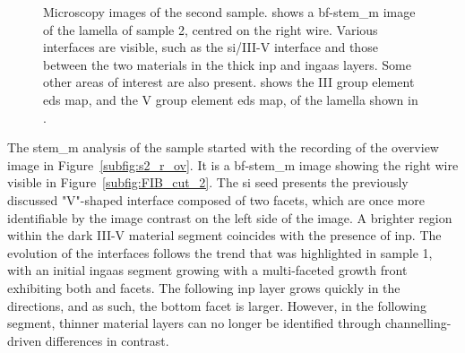 \begin{figure}
{    }
    \caption[\acs{bf}-\acs{stem_m} overview image of a nanowire cross section with \acs{eds} maps.]{Microscopy images of the second sample.  shows a \acs{bf}-\acs{stem_m} image of the lamella of sample 2, centred on the right wire. Various interfaces are visible, such as the \acs{si}/III-V interface and those between the two materials in the thick \acs{inp} and \acs{ingaas} layers. Some other areas of interest are also present.  shows the III group element \acs{eds} map, and  the V group element \acs{eds} map, of the lamella shown in .}
    \label{fig:sample2_stem}
\end{figure}

The \acs{stem_m} analysis of the sample started with the recording of the overview image in Figure~\ref{subfig:s2_r_ov}. It is a \acs{bf}-\acs{stem_m} image showing the right wire visible in Figure~\ref{subfig:FIB_cut_2}. The \acl{si} seed presents the previously discussed "V"-shaped interface composed of two  facets, which are once more identifiable by the image contrast on the left side of the image. A brighter region within the dark III-V material segment coincides with the presence of \acs{inp}. The evolution of the interfaces follows the trend that was highlighted in sample 1, with an initial \acs{ingaas} segment growing with a multi-faceted growth front exhibiting both  and  facets. The following \acs{inp} layer grows quickly in the  directions, and as such, the bottom  facet is larger. However, in the following segment, thinner material layers can no longer be identified through channelling-driven differences in contrast.
\par
